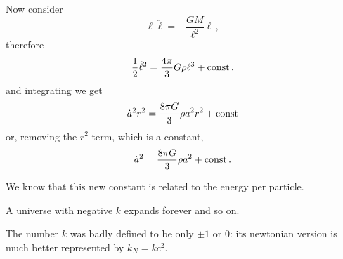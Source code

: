 \documentclass[main.tex]{subfiles}
\begin{document}
Now consider 
\begin{equation}
  \dot{\ell} \ddot{\ell} = - \frac{GM}{\ell^2} \dot{\ell}\,,
\end{equation}
%
therefore 
%
\begin{equation}
  \frac{1}{2}\dot{\ell}^2 = \frac{4 \pi}{3} G \rho \ell^{3} + \text{const}\,,
\end{equation}
%
and integrating we get
%
\begin{equation}
  \dot{a}^2 r^2 = \frac{8 \pi G}{3} \rho a^2 r^2 + \text{const}
\end{equation}
%
or, removing the \(r^2\) term, which is a constant,
%
\begin{equation}
    \dot{a}^2 = \frac{8 \pi G}{3} \rho a^2 + \text{const}\,.
\end{equation}

We know that this new constant is related to the energy per particle. 

A universe with negative \(k\) expands forever and so on.

The number \(k\) was badly defined to be only \(\pm 1\) or 0: its newtonian version is much better represented by \(k_N = kc^2\).
\end{document}
